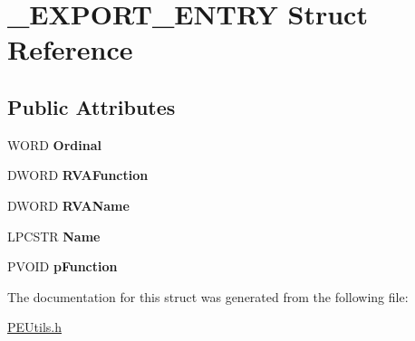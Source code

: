 \hypertarget{struct___e_x_p_o_r_t___e_n_t_r_y}{}\section{\+\_\+\+E\+X\+P\+O\+R\+T\+\_\+\+E\+N\+T\+RY Struct Reference}
\label{struct___e_x_p_o_r_t___e_n_t_r_y}
\subsection*{Public Attributes}
\begin{DoxyCompactItemize}
\item 
\mbox{\label{struct___e_x_p_o_r_t___e_n_t_r_y_ae4958615db205574c0eed7df1e712110}} 
W\+O\+RD {\bfseries Ordinal}
\item 
\mbox{\label{struct___e_x_p_o_r_t___e_n_t_r_y_a54686a2c3343fcc213c24280ab84ea89}} 
D\+W\+O\+RD {\bfseries R\+V\+A\+Function}
\item 
\mbox{\label{struct___e_x_p_o_r_t___e_n_t_r_y_a32996764883a5e93c8f561b28cf65ddd}} 
D\+W\+O\+RD {\bfseries R\+V\+A\+Name}
\item 
\mbox{\label{struct___e_x_p_o_r_t___e_n_t_r_y_ac1eff87065b30e0994bc4e2e838e3a19}} 
L\+P\+C\+S\+TR {\bfseries Name}
\item 
\mbox{\label{struct___e_x_p_o_r_t___e_n_t_r_y_a4da091dbc4e88ecf479381ea3d73b024}} 
P\+V\+O\+ID {\bfseries p\+Function}
\end{DoxyCompactItemize}


The documentation for this struct was generated from the following file\+:\begin{DoxyCompactItemize}
\item 
\mbox{\hyperlink{_p_e_utils_8h}{P\+E\+Utils.\+h}}\end{DoxyCompactItemize}

